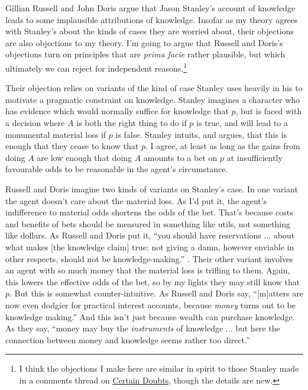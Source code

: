 Gillian Russell and John Doris \citeyearpar{RussellDoris2008} argue that Jason Stanley's account of knowledge leads to some implausible attributions of knowledge. Insofar as my theory agrees with Stanley's about the kinds of cases they are worried about, their objections are also objections to my theory. I'm going to argue that Russell and Doris's objections turn on principles that are \textit{prima facie} rather plausible, but which ultimately we can reject for independent reasons.\footnote{I think the objections I make here are similar in spirit to those Stanley made in a comments thread on \href{http://el-prod.baylor.edu/certain_doubts/?p=616}{Certain Doubts}, though the details are new.}

Their objection relies on variants of the kind of case Stanley uses heavily in his \citeyearpar{Stanley2005} to motivate a pragmatic constraint on knowledge. Stanley imagines a character who has evidence which would normally suffice for knowledge that \(p\), but is faced with a decision where \(A\) is both the right thing to do if \(p\) is true, and will lead to a monumental material loss if \(p\) is false. Stanley intuits, and argues, that this is enough that they cease to know that \(p\). I agree, at least as long as the gains from doing \(A\) are low enough that doing \(A\) amounts to a bet on \(p\) at insufficiently favourable odds to be reasonable in the agent's circumstance.

Russell and Doris imagine two kinds of variants on Stanley's case. In one variant the agent doesn't care about the material loss. As I'd put it, the agent's indifference to material odds shortens the odds of the bet. That's because costs and benefits of bets should be measured in something like utils, not something like dollars. As Russell and Doris put it, ``you should have reservations ... about what makes [the knowledge claim] true: not giving a damn, however enviable in other respects, should not be knowledge-making.'' \citep[??]{RussellDoris2008}. Their other variant involves an agent with so much money that the material loss is trifling to them. Again, this lowers the effective odds of the bet, so by my lights they may still know that \(p\). But this is somewhat counter-intuitive. As Russell and Doris say, ``[m]atters are now even dodgier for practical interest accounts, because \textit{money} turns out to be knowledge making.'' \citep[??]{RussellDoris2008} And this isn't just because wealth can purchase knowledge. As they say, ``money may buy the \textit{instruments} of knowledge ... but here the connection between money and knowledge seems rather too direct.'' \citep[??]{RussellDoris2008}

